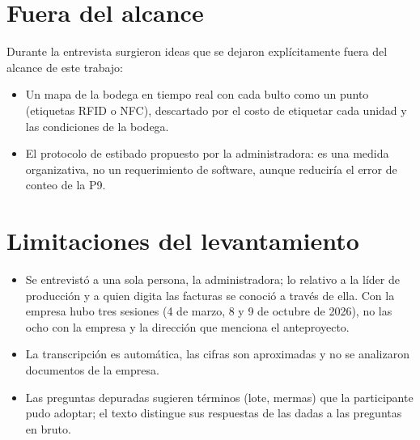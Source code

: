 \section{Fuera del alcance}
\label{sec:req_alcance}

Durante la entrevista surgieron ideas que se dejaron explícitamente fuera del alcance de este trabajo:

\begin{itemize}
    \item Un mapa de la bodega en tiempo real con cada bulto como un punto (etiquetas RFID o NFC), descartado por el costo de etiquetar cada unidad y las condiciones de la bodega.
    \item El protocolo de estibado propuesto por la administradora: es una medida organizativa, no un requerimiento de software, aunque reduciría el error de conteo de la P9.
\end{itemize}

\section{Limitaciones del levantamiento}
\label{sec:req_limitaciones}

\begin{itemize}
    \item Se entrevistó a una sola persona, la administradora; lo relativo a la líder de producción y a quien digita las facturas se conoció a través de ella. Con la empresa hubo tres sesiones (4 de marzo, 8 y 9 de octubre de 2026), no las ocho con la empresa y la dirección que menciona el anteproyecto.
    \item La transcripción es automática, las cifras son aproximadas y no se analizaron documentos de la empresa.
    \item Las preguntas depuradas sugieren términos (lote, mermas) que la participante pudo adoptar; el texto distingue sus respuestas de las dadas a las preguntas en bruto.
\end{itemize}
